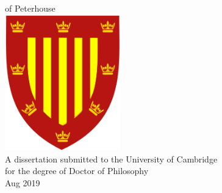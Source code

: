 \begin{center}%
	\begin{doublespace}%
		{\Huge\textbf{\thetitle}}\\%
	\end{doublespace}%
	\vspace*{3cm}%
	{\Large{\theauthor} \\ of Peterhouse }\\%
	\vspace*{3cm}%
	\includegraphics[width=5cm]{Peterhouse.png} \\
	\vspace*{2cm}
	{A dissertation submitted to the University of Cambridge\\ for the degree of Doctor of Philosophy \\ Aug 2019}
\end{center}%
